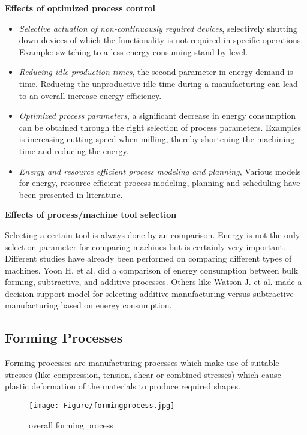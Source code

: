 \textbf{Effects of optimized process control}
\begin{itemize}  
\item \textit{Selective actuation of non-continuously required devices}, selectively shutting down devices of which the functionality is not required in specific operations. Example: switching to a less energy consuming stand-by level.
\item \textit{Reducing idle production times}, the second parameter in energy demand is time. Reducing the unproductive idle time during a manufacturing can lead to an overall increase energy efficiency.
\item \textit{Optimized process parameters}, a significant decrease in energy consumption can be obtained through the right selection of process parameters. Examples is increasing cutting speed when milling, thereby shortening the machining time and reducing the energy. 
\item \textit{Energy and resource efficient process modeling and planning}, Various models for energy, resource efficient process modeling, planning and scheduling have been presented in literature. 
\end{itemize}

\textbf{Effects of process/machine tool selection}

Selecting a certain tool is always done by an comparison. Energy is not the only selection parameter for comparing machines but is certainly very important. Different studies have already been performed on comparing different types of machines. Yoon H. et al. \cite{Yoon2014} did a comparison of energy consumption between bulk forming, subtractive, and additive processes. Others like Watson J. et al. \cite{Watson2018} made a decision-support model for selecting additive manufacturing versus subtractive manufacturing based on energy consumption.

\subsection{Forming Processes}

Forming processes are manufacturing processes which make use of suitable stresses (like compression, tension, shear or combined stresses) which cause plastic deformation of the materials to produce required shapes. 

\begin{figure}[H]
	\centering
	\texttt{[image: Figure/formingprocess.jpg]}
	\caption{overall forming process}
	\label{fig:formingprocess}
\end{figure}

